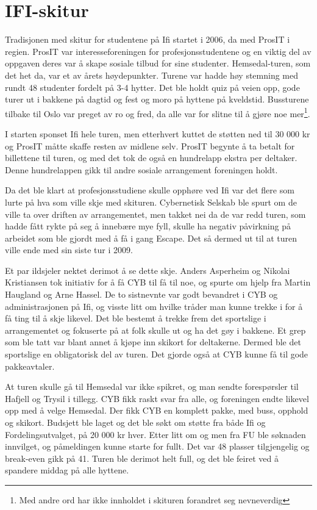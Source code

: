 \chapter{IFI-skitur}

\author{Skrevet av Arne Hassel}

Tradisjonen med skitur for studentene på Ifi startet i 2006, da med ProsIT i regien. ProsIT var interesseforeningen for profesjonsstudentene og en viktig del av oppgaven deres var å skape sosiale tilbud for sine studenter. Hemsedal-turen, som det het da, var et av årets høydepunkter. Turene var hadde høy stemning med rundt 48 studenter fordelt på 3-4 hytter. Det ble holdt quiz på veien opp, gode turer ut i bakkene på dagtid og fest og moro på hyttene på kveldstid. Bussturene tilbake til Oslo var preget av ro og fred, da alle var for slitne til å gjøre noe mer\footnote{Med andre ord har ikke innholdet i skituren forandret seg nevneverdig}.

I starten sponset Ifi hele turen, men etterhvert kuttet de støtten ned til 30 000 kr og ProsIT måtte skaffe resten av midlene selv. ProsIT begynte å ta betalt for billettene til turen, og med det tok de også en hundrelapp ekstra per deltaker. Denne hundrelappen gikk til andre sosiale arrangement foreningen holdt.

Da det ble klart at profesjonsstudiene skulle opphøre ved Ifi var det flere som lurte på hva som ville skje med skituren. Cybernetisk Selskab ble spurt om de ville ta over driften av arrangementet, men takket nei da de var redd turen, som hadde fått rykte på seg å innebære mye fyll, skulle ha negativ påvirkning på arbeidet som ble gjordt med å få i gang Escape. Det så dermed ut til at turen ville ende med sin siste tur i 2009.

Et par ildsjeler nektet derimot å se dette skje. Anders Asperheim og Nikolai Kristiansen tok initiativ for å få CYB til få til noe, og spurte om hjelp fra Martin Haugland og Arne Hassel. De to sistnevnte var godt bevandret i CYB og administrasjonen på Ifi, og visste litt om hvilke tråder man kunne trekke i for å få ting til å skje likevel. Det ble bestemt å trekke frem det sportslige i arrangementet og fokuserte på at folk skulle ut og ha det gøy i bakkene. Et grep som ble tatt var blant annet å kjøpe inn skikort for deltakerne. Dermed ble det sportslige en obligatorisk del av turen. Det gjorde også at CYB kunne få til gode pakkeavtaler.

At turen skulle gå til Hemsedal var ikke spikret, og man sendte forespørsler til Hafjell og Trysil i tillegg. CYB fikk raskt svar fra alle, og foreningen endte likevel opp med å velge Hemsedal. Der fikk CYB en komplett pakke, med buss, opphold og skikort. Budsjett ble laget og det ble søkt om støtte fra både Ifi og Fordelingsutvalget, på 20 000 kr hver. Etter litt om og men fra FU ble søknaden innvilget, og påmeldingen kunne starte for fullt. Det var 48 plasser tilgjengelig og break-even gikk på 41. Turen ble derimot helt full, og det ble feiret ved å spandere middag på alle hyttene.

